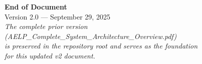 \documentclass[11pt,a4paper]{report}
\begin{document}
\vfill
\begin{center}
\large
\textbf{End of Document}\\
\vspace{0.5cm}
Version 2.0 --- September 29, 2025\\
\vspace{1cm}
\textit{The complete prior version (AELP\_Complete\_System\_Architecture\_Overview.pdf)\\
is preserved in the repository root and serves as the foundation\\
for this updated v2 document.}
\end{center}
\end{document}
